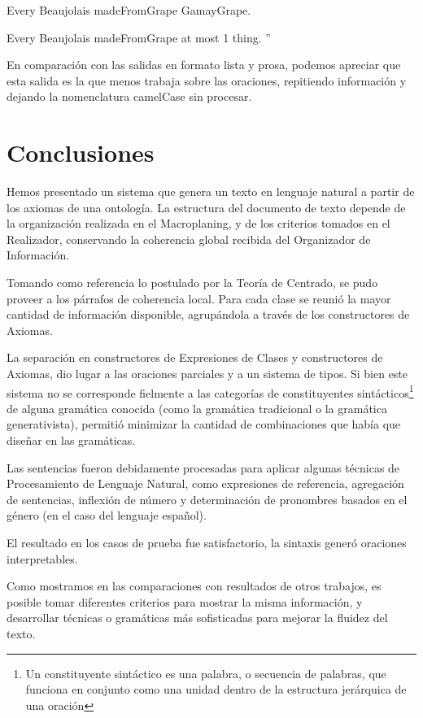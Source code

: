 Every Beaujolais madeFromGrape GamayGrape.

Every Beaujolais madeFromGrape at most 1 thing.
''

En comparación con las salidas en formato lista y prosa, podemos apreciar que esta salida es la que menos trabaja sobre las oraciones, repitiendo información y dejando la nomenclatura camelCase sin procesar.

\section{Conclusiones}
Hemos presentado un sistema que genera un texto en lenguaje natural a partir de los axiomas de una ontología. La estructura del documento de texto depende de la organización realizada en el Macroplaning, y de los criterios tomados en el Realizador, conservando la coherencia global recibida del Organizador de Información. 

Tomando como referencia lo postulado por la Teoría de Centrado, se pudo proveer a los párrafos de coherencia local. Para cada clase se reunió la mayor cantidad de información disponible, agrupándola a través de los constructores de Axiomas.

La separación en constructores de Expresiones de Clases y constructores de Axiomas, dio lugar a las oraciones parciales y a un sistema de tipos. Si bien este sistema no se corresponde fielmente a las categorías de constituyentes sintácticos\footnote{Un constituyente sintáctico es una palabra, o secuencia de palabras, que funciona en conjunto como una unidad dentro de la estructura jerárquica de una oración} de alguna gramática conocida (como la gramática tradicional o la gramática generativista), permitió minimizar la cantidad de combinaciones que había que diseñar en las gramáticas.

Las sentencias fueron debidamente procesadas para aplicar algunas técnicas de Procesamiento de Lenguaje Natural, como expresiones de referencia, agregación de sentencias, inflexión de número y determinación de pronombres basados en el género (en el caso del lenguaje español). 

El resultado en los casos de prueba fue satisfactorio, la sintaxis generó oraciones interpretables.

Como mostramos en las comparaciones con resultados de otros trabajos, es posible tomar diferentes criterios para mostrar la misma información, y desarrollar técnicas o gramáticas más sofisticadas para mejorar la fluidez del texto.